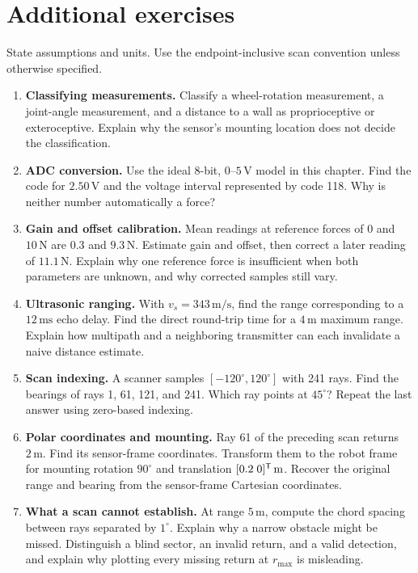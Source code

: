 \section{Additional exercises}
State assumptions and units. Use the endpoint-inclusive scan convention unless
otherwise specified.
\begin{enumerate}
\item \textbf{Classifying measurements.} Classify a wheel-rotation measurement,
a joint-angle measurement, and a distance to a wall as proprioceptive or
exteroceptive. Explain why the sensor's mounting location does not decide
the classification.

\item \textbf{ADC conversion.} Use the ideal 8-bit, 0--$5\,\mathrm V$ model
in this chapter. Find the code for $2.50\,\mathrm V$ and the voltage interval
represented by code 118. Why is neither number automatically a force?

\item \textbf{Gain and offset calibration.} Mean readings at reference
forces of 0 and $10\,\mathrm N$ are 0.3 and $9.3\,\mathrm N$.
Estimate gain and offset, then correct a later reading of $11.1\,\mathrm N$.
Explain why one reference force is insufficient when both parameters are
unknown, and why corrected samples still vary.

\item \textbf{Ultrasonic ranging.} With $v_s=343\,\mathrm{m/s}$, find the
range corresponding to a $12\,\mathrm{ms}$ echo delay. Find the direct
round-trip time for a $4\,\mathrm m$ maximum range. Explain how multipath
and a neighboring transmitter can each invalidate a naive distance estimate.

\item \textbf{Scan indexing.} A scanner samples $[-120^\circ,120^\circ]$
with 241 rays. Find the bearings of rays 1, 61, 121, and 241. Which ray
points at $45^\circ$? Repeat the last answer using zero-based indexing.

\item \textbf{Polar coordinates and mounting.} Ray 61 of the preceding scan
returns $2\,\mathrm m$. Find its sensor-frame coordinates. Transform them
to the robot frame for mounting rotation $90^\circ$ and translation
$[0.2\;0]^{\mathsf T}\,\mathrm m$. Recover the original range and bearing from
the sensor-frame Cartesian coordinates.

\item \textbf{What a scan cannot establish.} At range $5\,\mathrm m$, compute
the chord spacing between rays separated by $1^\circ$. Explain why a narrow
obstacle might be missed. Distinguish a blind sector, an invalid return,
and a valid detection, and explain why plotting every missing return at
$r_{\max}$ is misleading.
\end{enumerate}
